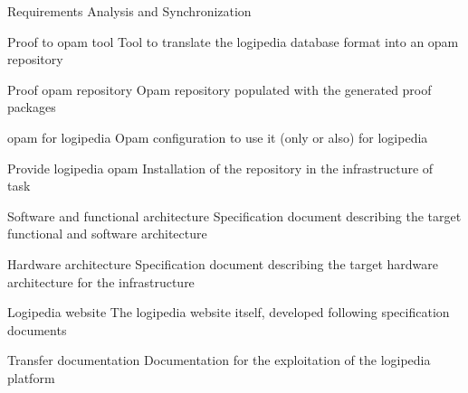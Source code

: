 \begin{workpackage}[id=access,wphases=0-48,type=MGT,
  short=Access,%
  title={Access to the infrastructure},
  lead=Inr,
  InrRM=28,
  OcaRM=6]
\begin{tasklist}
\begin{task}[id=transfer,title=Transfer for the sustainability of the system,lead=Irt]
\end{task}



\end{tasklist}

\begin{wpdelivs}
  \begin{wpdeliv}[due=3,miles=startup,id=requirements,dissem=PU,nature=DEM,lead=Inr]
      {Requirements Analysis and Synchronization}
  \end{wpdeliv}
  \begin{wpdeliv}[due=2,miles=???,id=acessopamtool,dissem=PU,nature=DEM,lead=Oca]
    {Proof to opam tool}
    Tool to translate the logipedia database format into an opam repository
  \end{wpdeliv}
  \begin{wpdeliv}[due=2,miles=???,id=acessopamrepo,dissem=PU,nature=DEM,lead=Oca]
    {Proof opam repository}
    Opam repository populated with the generated proof packages
  \end{wpdeliv}
  \begin{wpdeliv}[due=1,miles=???,id=accessopamconfig,dissem=PU,nature=DEM,lead=Oca]
    {opam for logipedia}
    Opam configuration to use it (only or also) for logipedia
  \end{wpdeliv}
  \begin{wpdeliv}[due=1,miles=???,id=accessopam,dissem=PU,nature=DEM,lead=Oca]
    {Provide logipedia opam}
    Installation of the repository in the infrastructure of task~
  \end{wpdeliv}
  \begin{wpdeliv}[due=18,miles=???,id=archi-spec,dissem=PU,nature=R,lead=Irt]
    {Software and functional architecture}
    Specification document describing the target functional and software architecture
  \end{wpdeliv}
  \begin{wpdeliv}[due=20,miles=???,id=infra-spec,dissem=PU,nature=R,lead=Irt]
    {Hardware architecture}
    Specification document describing the target hardware architecture for the infrastructure
  \end{wpdeliv}
  \begin{wpdeliv}[due=48,miles=???,id=website,dissem=PU,nature=D,lead=Irt]
    {Logipedia website}
    The logipedia website itself, developed following specification documents
  \end{wpdeliv}
  \begin{wpdeliv}[due=48,miles=???,id=transfer-doc,dissem=PU,nature=R,lead=Irt]
    {Transfer documentation}
    Documentation for the exploitation of the logipedia platform
  \end{wpdeliv}
\end{wpdelivs}
\end{workpackage}


